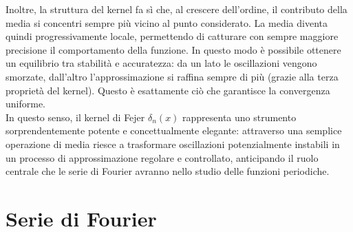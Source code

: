 \documentclass[a4paper,12pt]{report}
\begin{document}
Inoltre, la struttura del kernel fa sì che, al crescere dell’ordine, il contributo della media si concentri sempre più vicino al punto considerato. La media diventa quindi progressivamente locale, permettendo di catturare con sempre maggiore precisione il comportamento della funzione. In questo modo è possibile ottenere un equilibrio tra stabilità e accuratezza: da un lato le oscillazioni vengono smorzate, dall’altro l’approssimazione si raffina sempre di più (grazie alla terza proprietà del kernel). Questo è esattamente ciò che garantisce la convergenza uniforme.
\\In questo senso, il kernel di Fejer $\delta_n(x)$ rappresenta uno strumento sorprendentemente potente e concettualmente elegante: attraverso una semplice operazione di media riesce a trasformare oscillazioni potenzialmente instabili in un processo di approssimazione regolare e controllato, anticipando il ruolo centrale che le serie di Fourier avranno nello studio delle funzioni periodiche.

\newpage

\section{Serie di Fourier}
\end{document}
